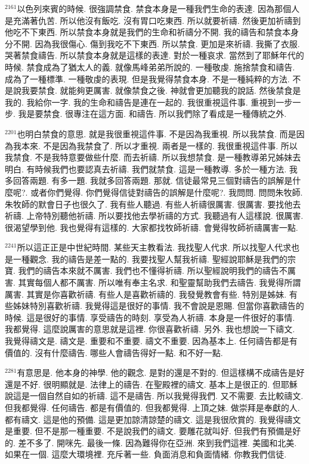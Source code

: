 \documentclass{book}
\begin{document}
$^{2161}$以色列來賓的時候.
很強調禁食.
禁食本身是一種我們生命的表達.
因為那個人是充滿著仇苦.
所以他沒有飯吃.
沒有胃口吃東西.
所以就要祈禱.
然後更加祈禱到他吃不下東西.
所以禁食本身就是我們的生命和祈禱分不開.
我的禱告和禁食本身分不開.
因為我很傷心.
傷到我吃不下東西.
所以禁食.
更加是來祈禱.
我撕了衣服.
哭著禁食禱告.
所以禁食本身就是這樣的表達.
對於一種哀求.
當然到了耶穌年代的時候.
禁食成為了猶太人的義.
就像馬峰弟弟所說的.
一種敬虔.
施捨禁食和禱告.
成為了一種標準.
一種敬虔的表現.
但是我覺得禁食本身.
不是一種純粹的方法.
不是說我要禁食.
就能夠更厲害.
就像禁食之後.
神就會更加聽我的說話.
然後禁食是我的.
我給你一字.
我的生命和禱告是連在一起的.
我很重視這件事.
重視到一步一步.
我是要禁食.
很專注在這方面.
和禱告.
所以我們除了看成是一種傳統之外.

$^{2201}$也明白禁食的意思.
就是我很重視這件事.
不是因為我重視.
所以我禁食.
而是因為我本來.
不是因為我禁食了.
所以才重視.
兩者是一樣的.
我很重視這件事.
所以我禁食.
不是我特意要做些什麼.
而去祈禱.
所以我想禁食.
是一種教導弟兄姊妹去明白.
有時候我們也要認真去祈禱.
我們就禁食.
這是一種教導.
多於一種方法.
我多回答兩題.
有多一題.
我就多回答兩題.
那就.
信徒最常見三個對禱告的誤解是什麼呢?.
或者你們覺得.
你們覺得信徒對禱告的誤解是什麼呢?.
我問問.
問問朱牧師.
朱牧師的默會日子也很久了.
我有些人聽過.
有些人祈禱很厲害.
很厲害.
要找他去祈禱.
上帝特別聽他祈禱.
所以要找他去學祈禱的方式.
我聽過有人這樣說.
很厲害.
很渴望學到他.
我也覺得有這樣的.
大家都找牧師祈禱.
會覺得牧師祈禱厲害一點.

$^{2241}$所以這正正是中世紀時間.
某些天主教看法.
我找聖人代求.
所以找聖人代求也是一種觀念.
我的禱告是差一點的.
我要找聖人幫我祈禱.
聖經說耶穌是我們的宗寶.
我們的禱告本來就不厲害.
我們也不懂得祈禱.
所以聖經說明我們的禱告不厲害.
其實每個人都不厲害.
所以唯有奉主名求.
和聖靈幫助我們去禱告.
我覺得所謂厲害.
其實是你喜歡祈禱.
有些人是喜歡祈禱的.
我發覺教會有些.
特別是姊妹.
有些姊妹特別喜歡祈禱.
我覺得這是很好的事情.
我不會說是恩賜.
但當你喜歡禱告的時候.
這是很好的事情.
享受禱告的時刻.
享受為人祈禱.
本身是一件很好的事情.
我都覺得.
這麼說厲害的意思就是這裡.
你很喜歡祈禱.
另外.
我也想說一下禱文.
我覺得禱文是.
禱文是.
重要和不重要.
禱文不重要.
因為基本上.
任何禱告都是有價值的.
沒有什麼禱告.
哪些人會禱告得好一點.
和不好一點.

$^{2281}$有意思是.
他本身的神學.
他的觀念.
是對的還是不對的.
但這樣構不成禱告是好還是不好.
很明顯就是.
法律上的禱告.
在聖殿裡的禱文.
基本上是很正的.
但耶穌說這是一個自然自如的祈禱.
這不是禱告.
所以我覺得我們.
又不需要.
去比較禱文.
但我都覺得.
任何禱告.
都是有價值的.
但我都覺得.
上頂之妹.
做崇拜是奉獻的人.
都有禱文.
這是他的預備.
這是更加諒清諒楚的禱文.
這是我很欣賞的.
我覺得禱文是重要.
但不是那一種重要.
不是說我們的禱文.
要雕花就叫好.
但我們有預備是好的.
差不多了.
開咪先.
最後一條.
因為難得你在亞洲.
來到我們這裡.
美國和北美.
如果在一個.
這麼大環境裡.
充斥著一些.
負面消息和負面情緒.
你教我們信徒.
\end{document}
